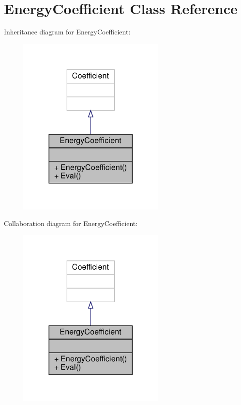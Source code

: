 \hypertarget{classEnergyCoefficient}{}\section{Energy\+Coefficient Class Reference}
\label{classEnergyCoefficient}


Inheritance diagram for Energy\+Coefficient\+:\nopagebreak
\begin{figure}[H]
\begin{center}
\leavevmode
\includegraphics[width=209pt]{classEnergyCoefficient__inherit__graph}
\end{center}
\end{figure}


Collaboration diagram for Energy\+Coefficient\+:\nopagebreak
\begin{figure}[H]
\begin{center}
\leavevmode
\includegraphics[width=209pt]{classEnergyCoefficient__coll__graph}
\end{center}
\end{figure}
